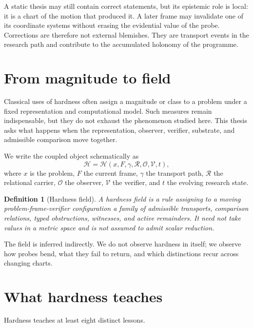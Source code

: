 \documentclass[12pt,openany]{book}
\newtheorem{definition}{Definition}[chapter]
\theoremstyle{remark}
\newcommand{\Hard}{\mathcal H}
\begin{document}
A static thesis may still contain correct statements, but its epistemic role is local: it is a chart of the motion that produced it. A later frame may invalidate one of its coordinate systems without erasing the evidential value of the probe. Corrections are therefore not external blemishes. They are transport events in the research path and contribute to the accumulated holonomy of the programme.

\section{From magnitude to field}
Classical uses of hardness often assign a magnitude or class to a problem under a fixed representation and computational model. Such measures remain indispensable, but they do not exhaust the phenomenon studied here. This thesis asks what happens when the representation, observer, verifier, substrate, and admissible comparison move together.

We write the coupled object schematically as
\[
\Hard=\Hard(x,F,\gamma,\mathcal R,\mathcal O,\mathcal V,t),
\]
where $x$ is the problem, $F$ the current frame, $\gamma$ the transport path, $\mathcal R$ the relational carrier, $\mathcal O$ the observer, $\mathcal V$ the verifier, and $t$ the evolving research state.

\begin{definition}[Hardness field]
A hardness field is a rule assigning to a moving problem-frame-verifier configuration a family of admissible transports, comparison relations, typed obstructions, witnesses, and active remainders. It need not take values in a metric space and is not assumed to admit scalar reduction.
\end{definition}

The field is inferred indirectly. We do not observe hardness in itself; we observe how probes bend, what they fail to return, and which distinctions recur across changing charts.

\section{What hardness teaches}
Hardness teaches at least eight distinct lessons.
\end{document}
